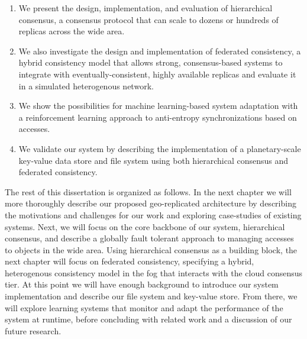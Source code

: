 \begin{enumerate}
    \item We present the design, implementation, and evaluation of hierarchical consensus, a consensus protocol that can scale to dozens or hundreds of replicas across the wide area.
    \item We also investigate the design and implementation of federated consistency, a hybrid consistency model that allows strong, consensus-based systems to integrate with eventually-consistent, highly available replicas and evaluate it in a simulated heterogenous network.
    \item We show the possibilities for machine learning-based system adaptation with a reinforcement learning approach to anti-entropy synchronizations based on accesses.
    \item We validate our system by describing the implementation of a planetary-scale key-value data store and file system using both hierarchical consensus and federated consistency.
\end{enumerate}


The rest of this dissertation is organized as follows.
In the next chapter we will more thoroughly describe our proposed geo-replicated architecture by describing the motivations and challenges for our work and exploring case-studies of existing systems.
Next, we will focus on the core backbone of our system, hierarchical consensus, and describe a globally fault tolerant approach to managing accesses to objects in the wide area.
Using hierarchical consensus as a building block, the next chapter will focus on federated consistency, specifying a hybrid, heterogenous consistency model in the fog that interacts with the cloud consensus tier.
At this point we will have enough background to introduce our system implementation and describe our file system and key-value store.
From there, we will explore learning systems that monitor and adapt the performance of the system at runtime, before concluding with related work and a discussion of our future research.
